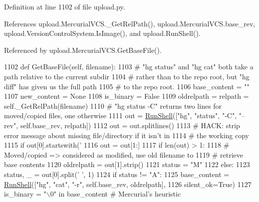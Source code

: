 Definition at line 1102 of file upload.\+py.



References upload.\+Mercurial\+V\+C\+S.\+\_\+\+Get\+Rel\+Path(), upload.\+Mercurial\+V\+C\+S.\+base\+\_\+rev, upload.\+Version\+Control\+System.\+Is\+Image(), and upload.\+Run\+Shell().



Referenced by upload.\+Mercurial\+V\+C\+S.\+Get\+Base\+File().


\begin{DoxyCode}
1102   \textcolor{keyword}{def }GetBaseFile(self, filename):
1103     \textcolor{comment}{# "hg status" and "hg cat" both take a path relative to the current subdir}
1104     \textcolor{comment}{# rather than to the repo root, but "hg diff" has given us the full path}
1105     \textcolor{comment}{# to the repo root.}
1106     base\_content = \textcolor{stringliteral}{""}
1107     new\_content = \textcolor{keywordtype}{None}
1108     is\_binary = \textcolor{keyword}{False}
1109     oldrelpath = relpath = self.\_GetRelPath(filename)
1110     \textcolor{comment}{# "hg status -C" returns two lines for moved/copied files, one otherwise}
1111     out = \hyperlink{namespaceupload_adddc423c49132e8879cbb25d6be2cf11}{RunShell}([\textcolor{stringliteral}{"hg"}, \textcolor{stringliteral}{"status"}, \textcolor{stringliteral}{"-C"}, \textcolor{stringliteral}{"--rev"}, self.base\_rev, relpath])
1112     out = out.splitlines()
1113     \textcolor{comment}{# HACK: strip error message about missing file/directory if it isn't in}
1114     \textcolor{comment}{# the working copy}
1115     \textcolor{keywordflow}{if} out[0].startswith(\textcolor{stringliteral}{'%
1116       out = out[1:]
1117     \textcolor{keywordflow}{if} len(out) > 1:
1118       \textcolor{comment}{# Moved/copied => considered as modified, use old filename to}
1119       \textcolor{comment}{# retrieve base contents}
1120       oldrelpath = out[1].strip()
1121       status = \textcolor{stringliteral}{"M"}
1122     \textcolor{keywordflow}{else}:
1123       status, \_ = out[0].split(\textcolor{stringliteral}{' '}, 1)
1124     \textcolor{keywordflow}{if} status != \textcolor{stringliteral}{"A"}:
1125       base\_content = \hyperlink{namespaceupload_adddc423c49132e8879cbb25d6be2cf11}{RunShell}([\textcolor{stringliteral}{"hg"}, \textcolor{stringliteral}{"cat"}, \textcolor{stringliteral}{"-r"}, self.base\_rev, oldrelpath],
1126         silent\_ok=\textcolor{keyword}{True})
1127       is\_binary = \textcolor{stringliteral}{"\(\backslash\)0"} \textcolor{keywordflow}{in} base\_content  \textcolor{comment}{# Mercurial's heuristic}
}
\end{DoxyCode}
